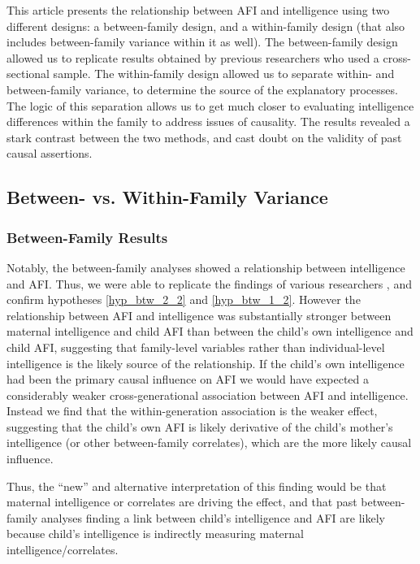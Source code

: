 This article presents the relationship between AFI and intelligence using two different designs: a between-family design, and a within-family design (that also includes between-family variance within it as well). The between-family design allowed us to replicate results obtained by previous researchers who used a cross-sectional sample. The within-family design allowed us to separate within- and between-family variance, to determine the source of the explanatory processes.  The logic of this separation allows us to get much closer to evaluating intelligence differences within the family to address issues of causality. The results revealed a stark contrast between the two methods, and cast doubt on the validity of past causal assertions.
\subsection{Between- vs. Within-Family Variance}
\subsubsection{Between-Family Results} Notably, the between-family analyses showed a relationship between intelligence and AFI. Thus, we were able to replicate the findings of various researchers \citep{halpern2000smart,mott1983early,Paul2000,Woodward2001}, and confirm hypotheses \ref{hyp_btw_2_2} and \ref{hyp_btw_1_2}. However the relationship between AFI and intelligence was substantially stronger between maternal intelligence and child AFI than between the child's own intelligence and child AFI, suggesting that family-level variables rather than individual-level intelligence is the likely source of the relationship. If the child's own intelligence had been the primary causal influence on AFI we would have expected a considerably weaker cross-generational association between AFI and intelligence. Instead we find that the within-generation association is the weaker effect, suggesting that the child's own AFI is likely derivative of the child's mother's intelligence (or other between-family correlates), which are the more likely causal influence.

Thus, the ``new'' and alternative interpretation of this finding would be that maternal intelligence or correlates are driving the effect, and that past between-family analyses finding a link between child's intelligence and AFI are likely because child's intelligence is indirectly measuring maternal intelligence/correlates. 

